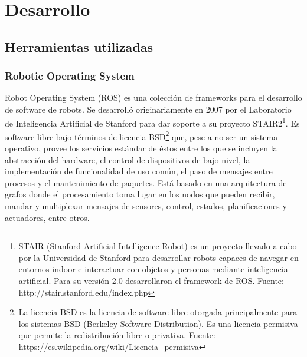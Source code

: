 




\pagestyle{fancy}

\maketitle

\tableofcontents



\part{Desarrollo}

\chapter{Herramientas utilizadas}

\section{Robotic Operating System}

Robot Operating System (ROS) es una colección de frameworks para el desarrollo de software de robots. Se desarrolló originariamente en 2007 por el Laboratorio de Inteligencia Artificial de Stanford para dar soporte a su proyecto STAIR2\footnote{STAIR (Stanford Artificial Intelligence Robot) es un proyecto llevado a cabo por la Universidad de Stanford para desarrollar robots capaces de navegar en entornos indoor e interactuar con objetos y personas mediante inteligencia artificial. Para su versión 2.0 desarrollaron el framework de ROS. Fuente: http://stair.stanford.edu/index.php}. Es software libre bajo términos de licencia BSD\footnote{La licencia BSD es la licencia de software libre otorgada principalmente para los sistemas BSD (Berkeley Software Distribution). Es una licencia permisiva que permite la redistribución libre o privativa. Fuente: https://es.wikipedia.org/wiki/Licencia\_permisiva} que, pese a no ser un sistema operativo, provee los servicios estándar de éstos entre los que se incluyen la abstracción del hardware, el control de dispositivos de bajo nivel, la implementación de funcionalidad de uso común, el paso de mensajes entre procesos y el mantenimiento de paquetes. Está basado en una arquitectura de grafos donde el procesamiento toma lugar en los nodos que pueden recibir, mandar y multiplexar mensajes de sensores, control, estados, planificaciones y actuadores, entre otros.\\

